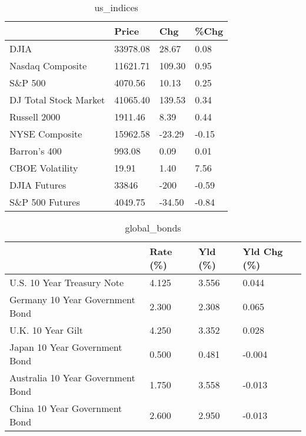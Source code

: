 \documentclass{article}%
\begin{document}
%


\begin{table}[htbp]%
\caption{us\_indices}%
\centering%
\begin{adjustbox}{width=1\textwidth}%
\begin{tabular}{llll}
\toprule
                      &    Price &    Chg &  \%Chg \\
\midrule
                 DJIA & 33978.08 &  28.67 &  0.08 \\
     Nasdaq Composite & 11621.71 & 109.30 &  0.95 \\
              S\&P 500 &  4070.56 &  10.13 &  0.25 \\
DJ Total Stock Market & 41065.40 & 139.53 &  0.34 \\
         Russell 2000 &  1911.46 &   8.39 &  0.44 \\
       NYSE Composite & 15962.58 & -23.29 & -0.15 \\
         Barron's 400 &   993.08 &   0.09 &  0.01 \\
      CBOE Volatility &    19.91 &   1.40 &  7.56 \\
         DJIA Futures &    33846 &   -200 & -0.59 \\
      S\&P 500 Futures &  4049.75 & -34.50 & -0.84 \\
\bottomrule
\end{tabular}
%
\end{adjustbox}%
\end{table}

%


\begin{table}[htbp]%
\caption{global\_bonds}%
\centering%
\begin{adjustbox}{width=1\textwidth}%
\begin{tabular}{llll}
\toprule
                                  & Rate (\%) & Yld (\%) & Yld Chg (\%) \\
\midrule
       U.S. 10 Year Treasury Note &    4.125 &   3.556 &       0.044 \\
  Germany 10 Year Government Bond &    2.300 &   2.308 &       0.065 \\
                U.K. 10 Year Gilt &    4.250 &   3.352 &       0.028 \\
    Japan 10 Year Government Bond &    0.500 &   0.481 &      -0.004 \\
Australia 10 Year Government Bond &    1.750 &   3.558 &      -0.013 \\
    China 10 Year Government Bond &    2.600 &   2.950 &      -0.013 \\
\bottomrule
\end{tabular}
%
\end{adjustbox}%
\end{table}
\end{document}
